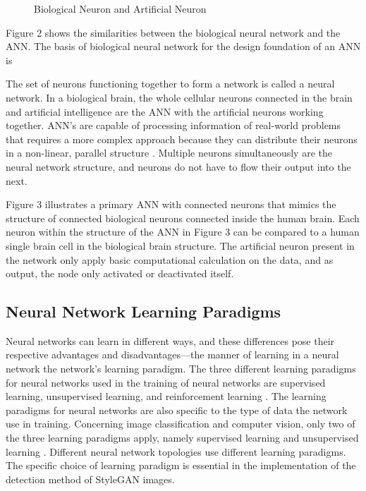 \begin{figure}[!htbp!]%
\centering
{}%
\caption{Biological Neuron and Artificial Neuron \cite{Krenker2011}}%
\label{fig:4}%
\end{figure}

Figure 2 shows the similarities between the biological neural network and the ANN. The basis of biological neural network for the design foundation of an ANN is 

The set of neurons functioning together to form a network is called a neural network. In a biological brain, the whole cellular neurons connected in the brain and artificial intelligence are the ANN with the artificial neurons working together. ANN's are capable of processing information of real-world problems that requires a more complex approach because they can distribute their neurons in a non-linear, parallel structure \citep{Krenker2011}. Multiple neurons simultaneously are the neural network structure, and neurons do not have to flow their output into the next.

Figure 3 illustrates a primary ANN with connected neurons that mimics the structure of connected biological neurons connected inside the human brain. Each neuron within the structure of the ANN in Figure 3 can be compared to a human single brain cell in the biological brain structure. The artificial neuron present in the network only apply basic computational calculation on the data, and as output, the node only activated or deactivated itself.

\subsection{Neural Network Learning Paradigms}

Neural networks can learn in different ways, and these differences pose their respective advantages and disadvantages—the manner of learning in a neural network the network's learning paradigm.  The three different learning paradigms for neural networks used in the training of neural networks are supervised learning, unsupervised learning, and reinforcement learning \citep{Krenker2011}. The learning paradigms for neural networks are also specific to the type of data the network use in training. Concerning image classification and computer vision, only two of the three learning paradigms apply, namely supervised learning and unsupervised learning \citep{OShea2015}. Different neural network topologies use different learning paradigms. The specific choice of learning paradigm is essential in the implementation of the detection method of StyleGAN images. 


